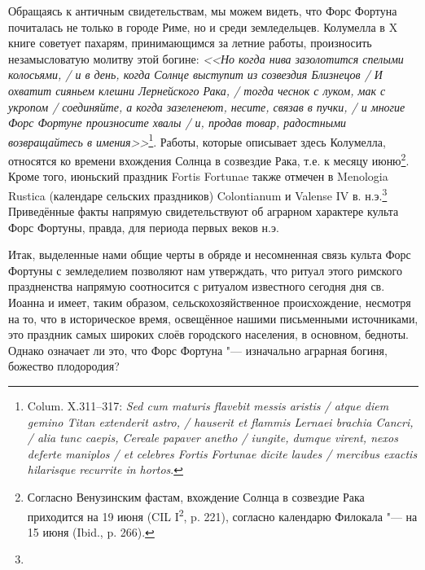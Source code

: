 
Обращаясь к античным свидетельствам, мы можем видеть, что Форс Фортуна почиталась не только в городе Риме, но и среди земледельцев. Колумелла в X книге советует пахарям, принимающимся за летние работы, произносить незамысловатую молитву этой богине: \textit{<<Но когда нива зазолотится спелыми колосьями, / и в день, когда Солнце выступит из созвездия Близнецов / И охватит сияньем клешни Лернейского Рака, / тогда чеснок с луком, мак с укропом / соединяйте, а когда зазеленеют, несите, связав в пучки, / и многие Форс Фортуне произносите хвалы / и, продав товар, радостными возвращайтесь в имения>>}\footnote{Colum. X.311--317: \textit{Sed cum maturis flavebit messis aristis / atque diem gemino Titan extenderit astro, / hauserit et flammis Lernaei brachia Cancri, / alia tunc caepis, Cereale papaver anetho / iungite, dumque virent, nexos deferte maniplos / et celebres Fortis Fortunae dicite laudes / mercibus exactis hilarisque recurrite in hortos}.}. Работы, которые описывает здесь Колумелла, относятся ко времени вхождения Солнца в созвездие Рака, т.е. к месяцу июню\footnote{Согласно Венузинским фастам, вхождение Солнца в созвездие Рака приходится на 19 июня (CIL I\textsuperscript{2}, p. 221), согласно календарю Филокала "--- на 15 июня (Ibid., p. 266).}. Кроме того, июньский праздник Fortis Fortunae также отмечен в Menologia Rustica (календаре сельских праздников) Colontianum и Valense IV в. н.э.\footnote{} Приведённые факты напрямую свидетельствуют об аграрном характере культа Форс Фортуны, правда, для периода первых веков н.э.


Итак, выделенные нами общие черты в обряде и несомненная связь культа Форс Фортуны с земледелием позволяют нам утверждать, что ритуал этого римского праздненства напрямую соотносится с ритуалом известного сегодня дня св. Иоанна и имеет, таким образом, сельскохозяйственное происхождение, несмотря на то, что в историческое время, освещённое нашими письменными источниками, это праздник самых широких слоёв городского населения, в основном, бедноты. Однако означает ли это, что Форс Фортуна "--- изначально аграрная богиня, божество плодородия?

